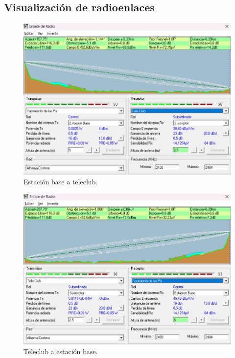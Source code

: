 \documentclass{article}
\begin{document}
\newpage

\subsection{Visualización de radioenlaces}

\begin{figure}[ht]
    \centering
    \includegraphics[width=0.8\linewidth]{src/EstacionBase-TeleClub.png}
    \caption{\label{fig:ebaseteleclub} Estación base a teleclub.}
\end{figure}

\newpage

\begin{figure}[ht]
    \centering
    \includegraphics[width=0.8\linewidth]{src/TeleClub-EstacionBase.png}
    \caption{\label{fig:teleclubebase} Teleclub a estación base.}
\end{figure}
\end{document}
